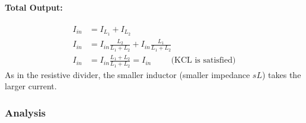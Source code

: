 \paragraph{Total Output:}
\begin{align*}
  I_{in} &= I_{L_1} + I_{L_2} \\
  I_{in} &= I_{in} \frac{L_2}{L_1 + L_2} + I_{in} \frac{L_1}{L_1 + L_2} \\
  I_{in} &= I_{in} \frac{L_1 + L_2}{L_1 + L_2} = I_{in} \hspace{1cm} \text{(KCL is satisfied)}
\end{align*}
As in the resistive divider, the smaller inductor (smaller impedance
\(sL\)) takes the larger current.

\subsubsection{Analysis}
